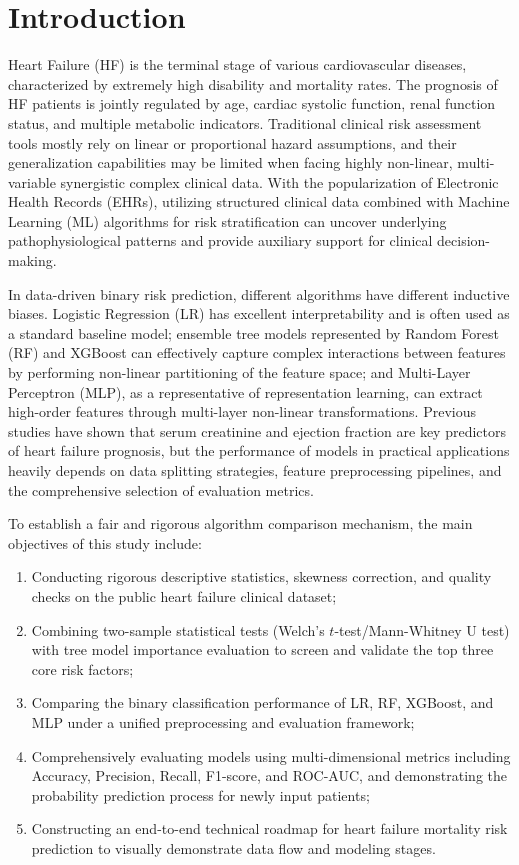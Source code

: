 \documentclass[12pt, a4paper]{article}
\begin{document}
\newpage

\section{Introduction}
Heart Failure (HF) is the terminal stage of various cardiovascular diseases, characterized by extremely high disability and mortality rates. The prognosis of HF patients is jointly regulated by age, cardiac systolic function, renal function status, and multiple metabolic indicators. Traditional clinical risk assessment tools mostly rely on linear or proportional hazard assumptions, and their generalization capabilities may be limited when facing highly non-linear, multi-variable synergistic complex clinical data. With the popularization of Electronic Health Records (EHRs), utilizing structured clinical data combined with Machine Learning (ML) algorithms for risk stratification can uncover underlying pathophysiological patterns and provide auxiliary support for clinical decision-making.

In data-driven binary risk prediction, different algorithms have different inductive biases. Logistic Regression (LR) has excellent interpretability and is often used as a standard baseline model; ensemble tree models represented by Random Forest (RF) and XGBoost can effectively capture complex interactions between features by performing non-linear partitioning of the feature space; and Multi-Layer Perceptron (MLP), as a representative of representation learning, can extract high-order features through multi-layer non-linear transformations. Previous studies have shown that serum creatinine and ejection fraction are key predictors of heart failure prognosis, but the performance of models in practical applications heavily depends on data splitting strategies, feature preprocessing pipelines, and the comprehensive selection of evaluation metrics.

To establish a fair and rigorous algorithm comparison mechanism, the main objectives of this study include:
\begin{enumerate}
    \item Conducting rigorous descriptive statistics, skewness correction, and quality checks on the public heart failure clinical dataset;
    \item Combining two-sample statistical tests (Welch's $t$-test/Mann-Whitney U test) with tree model importance evaluation to screen and validate the top three core risk factors;
    \item Comparing the binary classification performance of LR, RF, XGBoost, and MLP under a unified preprocessing and evaluation framework;
    \item Comprehensively evaluating models using multi-dimensional metrics including Accuracy, Precision, Recall, F1-score, and ROC-AUC, and demonstrating the probability prediction process for newly input patients;
    \item Constructing an end-to-end technical roadmap for heart failure mortality risk prediction to visually demonstrate data flow and modeling stages.
\end{enumerate}
\end{document}
